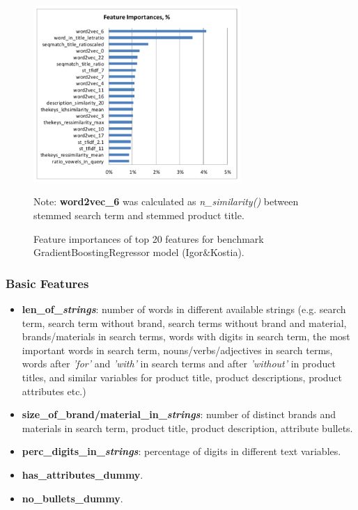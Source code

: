 \documentclass[12pt]{article}
\begin{document}
{{\begin{figure}
  \centering
  \includegraphics[width=0.7\textwidth]{../Fig/plot_feature_importances_benchmark.pdf}\\
  \caption{Feature importances of top 20 features for benchmark GradientBoostingRegressor model (Igor\&Kostia).}
  \label{Fig:feature_importance_IandK}
Note: \textbf{word2vec\_6} was calculated as \emph{n\_similarity()} between stemmed search term and stemmed product title.
\end{figure}

\subsubsection{Basic Features}
\label{subsubsec:Basic_Features_IandK}
\begin{itemize}
\item \textbf{len\_of\_\emph{strings}}: number of words in different available strings (e.g. search term, search term without brand, search terms without brand and material, brands/materials in search terms, words with digits in search term, the most important words in search term, nouns/verbs/adjectives in search terms, words after \emph{'for'} and \emph{'with'} in search terms and after \emph{'without'} in product titles, and similar variables for product title, product descriptions, product attributes etc.)
\item \textbf{size\_of\_brand/material\_in\_\emph{strings}}: number of distinct brands and materials in search term, product title, product description, attribute bullets.
\item \textbf{perc\_digits\_in\_\emph{strings}}: percentage of digits in different text variables.
\item \textbf{has\_attributes\_dummy}.
\item \textbf{no\_bullets\_dummy}.
\end{itemize}

}}
\end{document}
